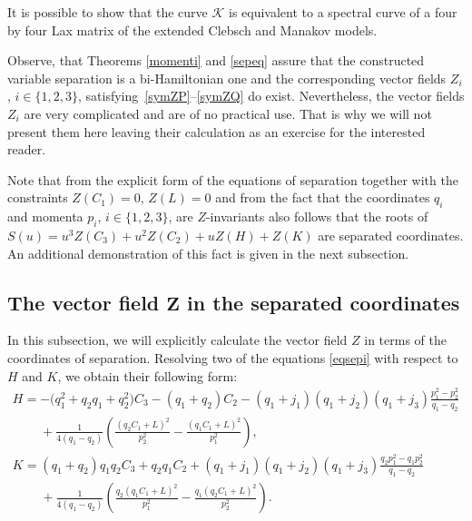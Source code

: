 \documentclass[pdftex]{sigma}
\numberwithin{equation}{section}
\begin{document}
\begin{Remark}
 It is possible to show that the curve $\mathcal{K}$ is equivalent to a spectral curve of a four by four Lax matrix of the extended Clebsch and Manakov models.
\end{Remark}



\begin{Remark}
 Observe, that Theorems \ref{momenti} and \ref{sepeq} assure that the constructed variable separation is a bi-Hamiltonian one and the corresponding vector fields $Z_i$, $i\in \{1,2,3\}$, satisfying~\eqref{symZP}--\eqref{symZQ} do exist.
Nevertheless, the vector fields $Z_i$ are very complicated and are of no practical use. That is why we will not present them here leaving their calculation as an exercise for the interested reader.
\end{Remark}

\begin{Remark}
Note that from the explicit form of the equations of separation together with the constraints $Z(C_1)=0$, $Z(L)=0$ and from the fact that the coordinates $q_i$ and momenta $p_i$, $i\in \{1,2,3\}$, are $Z$-invariants also follows that
 the roots of $S(u)=u^3 Z(C_3)+ u^2 Z(C_2)+u Z(H)+Z(K)$ are separated coordinates. An additional demonstration of this fact is given in the next subsection.
\end{Remark}

\subsection[The vector field Z in the separated coordinates]{The vector field $\boldsymbol{Z}$ in the separated coordinates}
In this subsection, we will explicitly calculate the vector field $Z$ in terms of the coordinates of separation.
Resolving two of the equations \eqref{eqsepi} with respect to $H$ and $K$, we obtain their following form:
\begin{subequations}\label{h-k}
\begin{gather}
H = -\big(q_1^2+q_2q_1+q_2^2\big)C_3-(q_1+q_2)C_2-(q_1+j_1)(q_1+j_2)(q_1+j_3) \frac{p_1^2-p_2^2}{q_1-q_2}\nonumber\\
\phantom{H=}{}+
\frac{1}{4(q_1-q_2)}\left(\frac{(q_2C_1+L)^2}{p_2^2}-\frac{(q_1C_1+L)^2}{p_1^2}\right),
\\
K =(q_1+q_2)q_1q_2C_3+ q_2q_1C_2+(q_1+j_1)(q_1+j_2)(q_1+j_3)\frac{q_2 p_1^2- q_1 p_2^2}{q_1-q_2}
 \nonumber\\
\phantom{K=}{}+
\frac{1}{4(q_1-q_2)}\left(\frac{q_2(q_1C_1+L)^2}{p_1^2}- \frac{q_1(q_2C_1+L)^2}{p_2^2}\right).
\end{gather}
\end{subequations}
\end{document}
